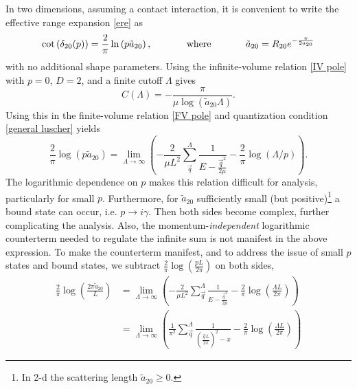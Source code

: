 In two dimensions, assuming a contact interaction, it is convenient to write the effective range expansion \eqref{ere} as
\begin{equation}
    \cot \left(\delta_{20}(p)\right)
    =
    \frac{2}{\pi} \ln \left(p \tilde a_{20}\right),
%
    \hspace{0.5in}
    \text{where}
    \hspace{0.5in}
%
    \tilde a_{20}
    =
    R_{20}e^{-\frac{\pi}{2 a_{20}}}
\end{equation}
with no additional shape parameters.
Using the infinite-volume relation \eqref{IV pole} with $p=0$, $D=2$, and a finite cutoff $\Lambda$ gives
\begin{equation}\label{eq:C2}
    C(\Lambda)
    =
    -\frac{\pi}{\mu \log \left(\tilde a_{20} \Lambda\right)}.
\end{equation}
Using this in the finite-volume relation \eqref{FV pole} and quantization condition \eqref{general luscher} yields
\begin{equation}\label{eq:first 2d}
    \frac{2}{\pi} \log \left(p\tilde a_{20}\right)
    =
    \lim_{\Lambda\to\infty}
    \left(
        -\frac{2}{\mu L^{2}} \sum_{\vec{q}}^{\Lambda} \frac{1}{E-\frac{\vec{q}^{2}}{2\mu}}
        -\frac{2}{\pi} \log (\Lambda / p)
    \right).
\end{equation}
The logarithmic dependence on $p$ makes this relation difficult for analysis, particularly for small $p$.
Furthermore, for $\tilde a_{20}$ sufficiently small (but positive)\footnote{
    In 2-d the scattering length $\tilde a_{20}\ge 0$\cite{}.
} a bound state can occur, i.e. $p\to i\gamma$.
Then both sides become complex, further complicating the analysis.
Also, the momentum-\emph{independent} logarithmic counterterm needed to regulate the infinite sum is not manifest in the above expression.
To make the counterterm manifest, and to address the issue of small $p$ states and bound states, we subtract $\frac{2}{\pi}\log\left(\frac{pL}{2\pi}\right)$ on both sides,
\begin{align}
    \frac{2}{\pi} \log \left(\frac{2\pi \tilde a_{20}}{L}\right)
    &=
    \lim_{\Lambda\to\infty}
    \left(
        -\frac{2}{\mu L^{2}} \sum_{\vec{q}}^{\Lambda} \frac{1}{E-\frac{\vec{q}^{2}}{2\mu}}
        -\frac{2}{\pi} \log \left(\frac{\Lambda L}{2\pi}\right)
    \right)
    \nonumber\\
    &=
    \lim_{\Lambda\to\infty}
    \left(
        \frac{1}{\pi^2} \sum_{\vec{q}}^{\Lambda} \frac{1}{\left(\frac{\vec{q}L}{2\pi}\right)^2-x}-\frac{2}{\pi} \log \left(\frac{\Lambda L}{2\pi}\right)
    \right)
    \label{eq:second 2d}
\end{align}

